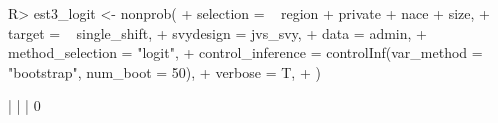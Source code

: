 \documentclass[
]{jss}
\begin{document}
\begin{CodeChunk}
\begin{CodeInput}
R> est3_logit <- nonprob(
+   selection = ~ region + private + nace + size,
+   target = ~ single_shift,
+   svydesign = jvs_svy,
+   data = admin,
+   method_selection = "logit",
+   control_inference = controlInf(var_method = "bootstrap", num_boot = 50),
+   verbose = T,
+ )
\end{CodeInput}
\begin{CodeOutput}
  |                                                                              |                                                                      |   0%
\end{CodeOutput}
\end{CodeChunk}
\end{document}
